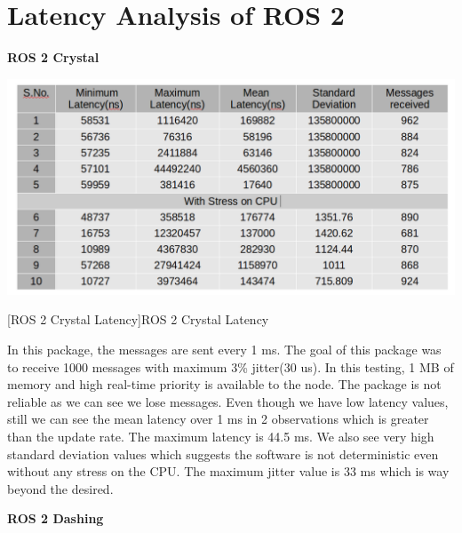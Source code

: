 \documentclass[%
xelatex,
	oneside,		%
	12pt,			%
	parskip=half,	%
	abstracton,
	chapterprefix=true%
    appendixprefix=true]
{scrbook}
\begin{document}
		\section{Latency Analysis of ROS 2}
\vspace*{0.5cm}
{\bfseries ROS 2 Crystal}
\begin{center}
\includegraphics[scale=0.4]{fig/ros2crylatency.png}

[ROS 2 Crystal Latency]{ROS 2 Crystal Latency}
\label{tab:ros2crystallatency}
\end{center}
In this package, the messages are sent every 1 ms. The goal of this package was to receive 1000 messages with maximum 3\% jitter(30 us). In this testing, 1 MB of memory and high real-time priority is available to the node. The package is not reliable as we can see we lose messages. Even though we have low latency values, still we can see the mean latency over 1 ms in 2 observations which is greater than the update rate. The maximum latency is 44.5 ms. We also see very high standard deviation values which suggests the software is not deterministic even without any stress on the CPU. The maximum jitter value is 33 ms which is way beyond the desired.
\vspace*{0.5cm}


{\bfseries ROS 2 Dashing}
\vspace*{0.5cm}
\end{document}
